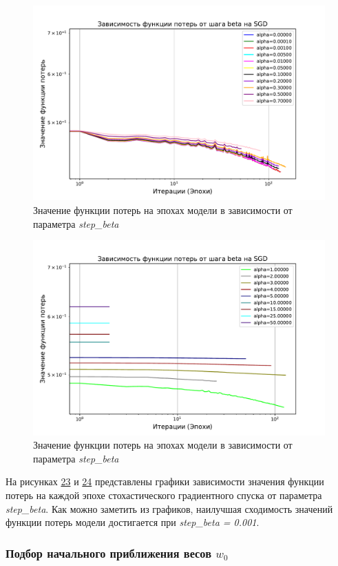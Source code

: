 \documentclass[14pt]{extarticle}
\begin{document}
\begin{figure}[H]
    \centering
    \includegraphics[width=0.7\linewidth]
    {exp_5_loss_beta_1.pdf}
    \caption{Значение функции потерь на эпохах модели в зависимости от параметра \textit{step\_beta}}
    \label{fig:exp_5_loss_beta_1}
\end{figure}

\begin{figure}[H]
    \centering
    \includegraphics[width=0.7\linewidth]
    {exp_5_loss_beta_2.pdf}
    \caption{Значение функции потерь на эпохах модели в зависимости от параметра \textit{step\_beta}}
    \label{fig:exp_5_loss_beta_2}
\end{figure}

На рисунках \hyperref[fig:exp_5_loss_beta_1]{23} и \hyperref[fig:exp_5_loss_beta_2]{24} представлены графики зависимости значения функции потерь на каждой  эпохе стохастического градиентного спуска от параметра \textit{step\_beta}. Как можно заметить из графиков, наилучшая сходимость значений функции потерь модели достигается при \textit{step\_beta = 0.001}.

\subsubsection{Подбор начального приближения весов \textit{$ w_0 $}}
\end{document}

